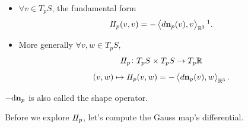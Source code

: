 \begin{definition}
    \hfill
    \begin{itemize}
        \item \(\forall v\in T_p S\), the  fundamental
        form 
        \[\II_p(v,v)=
        -\left\langle d\vb{n}_p(v),
        v\right\rangle_{\mathbb{R}^3}\footnotemark.\]
        \item More generally \(\forall v,w\in T_p S\), 
        \[
            I\!I_p\colon T_p S\times T_p S\to T_p \mathbb{R}
        \]
         \[   (v,w)\mapsto I\!I_p(v,w)=-\left\langle
                d\vb{n}_p(v),w\right\rangle_{\mathbb{R}^3}.
        \]

    \end{itemize}
    \(-\dd \vb{n}_p\) is also called the shape operator.
\end{definition}
Before we explore \(I\!I_p\), let's compute the Gauss map's
differential.

